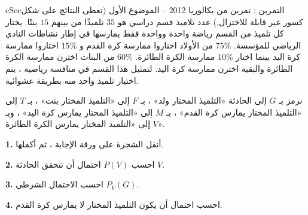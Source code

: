 \documentclass[12pt,a4paper]{article}
\newenvironment{BOX}[2]{\begin{otherlanguage}{english}\begin{arbox}{#1}{#2}}{\end{arbox}\end{otherlanguage}}
\newcounter{exo}
\newenvironment{tamrin}[1]{\stepcounter{exo}\begin{BOX}{cSec}{التمرين \theexo: #1}}{\end{BOX}}
\newenvironment{LTR}{\begin{otherlanguage}{english}}{\end{otherlanguage}}
\renewcommand{\ldots}{\mathinner{\ldotp\ldotp\ldotp}}
\newcommand{\QQ}[1]{\par\smallskip\textbf{#1.} }
\begin{document}
\begin{tamrin}{تمرين من بكالوريا 2012 -- الموضوع الأول}
(تعطى النتائج على شكل كسور غير قابلة للاختزال.) عدد تلاميذ قسم دراسي هو $35$ تلميذًا من بينهم $15$ بنتًا. يختار كل تلميذ من القسم رياضة واحدة وواحدة فقط يمارسها في إطار نشاطات النادي الرياضي للمؤسسة. $75\%$ من الأولاد اختاروا ممارسة كرة القدم و $15\%$ اختاروا ممارسة كرة اليد بينما اختار $10\%$ ممارسة الكرة الطائرة. $60\%$ من البنات اخترن ممارسة الكرة الطائرة والبقية اخترن ممارسة كرة اليد. لتمثيل هذا القسم في منافسة رياضية ، يتم اختيار تلميذ واحد منه بطريقة عشوائية.
\par نرمز بـ $G$ إلى الحادثة «التلميذ المختار ولد» ، بـ $F$ إلى «التلميذ المختار بنت» ، بـ $T$ إلى «التلميذ المختار يمارس كرة القدم» ، بـ $M$ إلى «التلميذ المختار يمارس كرة اليد» ، وبـ $V$ إلى «التلميذ المختار يمارس الكرة الطائرة».
\QQ{1} أنقل الشجرة على ورقة الإجابة ، ثم أكملها.
\QQ{2} احسب $P(V)$ احتمال أن تتحقق الحادثة $V$.
\QQ{3} احسب الاحتمال الشرطي $P_V(G)$.
\QQ{4} احسب احتمال أن يكون التلميذ المختار لا يمارس كرة القدم.
\par\begin{center}\begin{LTR}\end{LTR}\end{center}
\end{tamrin}
\end{document}
